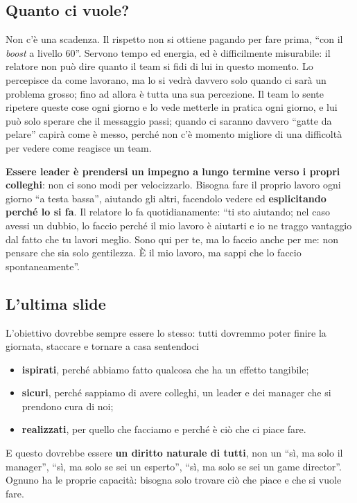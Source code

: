 \subsection{Quanto ci vuole?}

Non c'è una scadenza. Il rispetto non si ottiene pagando per fare prima, ``con il \emph{boost} a livello
60''. Servono tempo ed energia, ed è difficilmente misurabile: il relatore non può dire quanto il team si
fidi di lui in questo momento. Lo percepisce da come lavorano, ma lo si vedrà davvero solo quando ci sarà un
problema grosso; fino ad allora è tutta una sua percezione. Il team lo sente ripetere queste cose ogni giorno
e lo vede metterle in pratica ogni giorno, e lui può solo sperare che il messaggio passi; quando ci saranno
davvero ``gatte da pelare'' capirà come è messo, perché non c'è momento migliore di una difficoltà per vedere
come reagisce un team.

\textbf{Essere leader è prendersi un impegno a lungo termine verso i propri colleghi}: non ci sono modi per
velocizzarlo. Bisogna fare il proprio lavoro ogni giorno ``a testa bassa'', aiutando gli altri, facendolo
vedere ed \textbf{esplicitando perché lo si fa}. Il relatore lo fa quotidianamente: ``ti sto aiutando; nel
caso avessi un dubbio, lo faccio perché il mio lavoro è aiutarti e io ne traggo vantaggio dal fatto che tu
lavori meglio. Sono qui per te, ma lo faccio anche per me: non pensare che sia solo gentilezza. È il mio
lavoro, ma sappi che lo faccio spontaneamente''.

\subsection{L'ultima slide}

L'obiettivo dovrebbe sempre essere lo stesso: tutti dovremmo poter finire la giornata, staccare e tornare a
casa sentendoci
\begin{itemize}
  \item \textbf{ispirati}, perché abbiamo fatto qualcosa che ha un effetto tangibile;
  \item \textbf{sicuri}, perché sappiamo di avere colleghi, un leader e dei manager che si prendono cura di
        noi;
  \item \textbf{realizzati}, per quello che facciamo e perché è ciò che ci piace fare.
\end{itemize}
E questo dovrebbe essere \textbf{un diritto naturale di tutti}, non un ``sì, ma solo il manager'', ``sì, ma
solo se sei un esperto'', ``sì, ma solo se sei un game director''. Ognuno ha le proprie capacità: bisogna
solo trovare ciò che piace e che si vuole fare.

